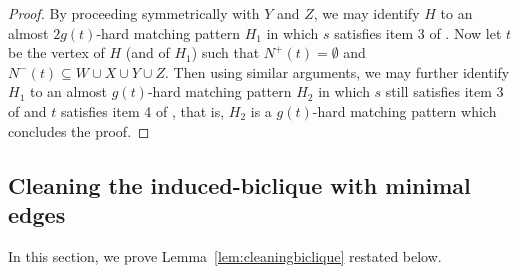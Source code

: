 \documentclass[a4paper,11pt]{article}
\theoremstyle{plain}
\newtheorem{identification rule}{Identification Rule}
\theoremstyle{definition}
\theoremstyle{remark}
\begin{document}
\begin{proof}
By proceeding symmetrically with $Y$ and $Z$, we may identify $H$ to an almost $2g(t)$-hard matching pattern $H_1$ in which $s$ satisfies item 3 of . 
Now let $t$ be the vertex of $H$ (and of $H_1$) such that $N^+(t) = \emptyset$ and $N^-(t) \subseteq W \cup X \cup Y \cup Z$. Then using similar arguments, we may further identify $H_1$ to an almost $g(t)$-hard matching pattern $H_2$ in which $s$ still satisfies item 3 of  and $t$ satisfies item 4 of , that is, $H_2$ is a $g(t)$-hard matching pattern which concludes the proof. 
\end{proof}
\newcommand{\secondhard}{second-hard-structure}
\subsection{Cleaning the induced-biclique with minimal edges}\label{sec:cleaningbiclique}

In this section, we prove Lemma~\ref{lem:cleaningbiclique} restated below.

\cleaningbiclique*
\end{document}
